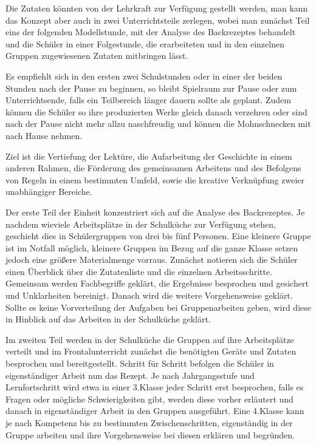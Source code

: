 Die Zutaten könnten von der Lehrkraft zur Verfügung gestellt werden, man kann das Konzept aber auch in zwei Unterrichtsteile zerlegen, wobei man zunächst Teil eins der folgenden Modellstunde, mit der Analyse des Backrezeptes behandelt und die Schüler in einer Folgestunde, die erarbeiteten und in den einzelnen Gruppen zugewiesenen Zutaten mitbringen lässt.

Es empfiehlt sich in den ersten zwei Schulstunden oder in einer der beiden Stunden nach der Pause zu beginnen, so bleibt Spielraum zur Pause oder zum Unterrichtsende, falls ein Teilbereich länger dauern sollte als geplant. Zudem können die Schüler so ihre produzierten Werke gleich danach verzehren oder sind nach der Pause nicht mehr allzu naschfreudig und können die Mohnschnecken mit nach Hause nehmen.

Ziel ist die Vertiefung der Lektüre, die Aufarbeitung der Geschichte in einem anderen Rahmen, die Förderung des gemeinsamen Arbeitens und des Befolgens von Regeln in einem bestimmten Umfeld, sowie die kreative Verknüpfung zweier unabhängiger Bereiche.

Der erste Teil der Einheit konzentriert sich auf die Analyse des Backrezeptes. Je nachdem wieviele Arbeitsplätze in der Schulküche zur Verfügung stehen, geschieht dies in Schülergruppen von drei bis fünf Personen. Eine kleinere Gruppe ist im Notfall möglich, kleinere Gruppen im Bezug auf die ganze Klasse setzen jedoch eine größere Materialmenge vorraus. Zunächst notieren sich die Schüler einen Überblick über die Zutatenliste und die einzelnen Arbeitsschritte. Gemeinsam werden Fachbegriffe geklärt, die Ergebnisse besprochen und gesichert und Unklarheiten bereinigt. Danach wird die weitere Vorgehensweise geklärt. Sollte es keine Vorverteilung der Aufgaben bei Gruppenarbeiten geben, wird diese in Hinblick auf das Arbeiten in der Schulküche geklärt.

Im zweiten Teil werden in der Schulküche die Gruppen auf ihre Arbeitsplätze verteilt und im Frontalunterricht zunächst die benötigten Geräte und Zutaten besprochen und bereitgestellt. Schritt für Schritt befolgen die Schüler in eigenständiger Arbeit nun das Rezept. Je nach Jahrgangsstufe und Lernfortschritt wird etwa in einer 3.Klasse  jeder Schritt erst besprochen, falls es Fragen oder mögliche Schwierigkeiten gibt, werden diese vorher erläutert und danach in eigenständiger Arbeit in den Gruppen ausgeführt. Eine 4.Klasse kann je nach Kompetenz bis zu bestimmten Zwischenschritten, eigenständig in der Gruppe arbeiten und ihre Vorgehensweise bei diesen erklären und begründen.

